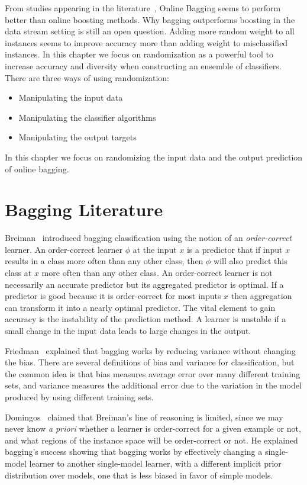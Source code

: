 From studies appearing in the literature~\cite{ozabagboost,ozaexp,ensemble},
Online Bagging seems to perform better than online boosting methods. Why bagging outperforms boosting in the data stream setting is still an open question. Adding more random weight to all instances seems to improve accuracy more than adding weight to misclassified instances. In this chapter %
 we focus on randomization as a powerful tool to increase accuracy and diversity when constructing an ensemble of classifiers.
There are three ways of using randomization:
\begin{itemize}
\item Manipulating the input data
\item Manipulating the classifier algorithms   
\item Manipulating the output targets
\end{itemize}
 
In this chapter we focus on randomizing the input data and the output prediction of online bagging.

\section{Bagging Literature}
\label{Rel}

Breiman~\cite{bagging} introduced bagging classification using the notion of an {\em order-correct} learner. An order-correct learner $\phi$ at the input $x$ is a predictor that if input $x$ results in a class more often than any other class, then $\phi$ will also predict this class at $x$ more often than any other class. An order-correct learner is not necessarily an accurate predictor but its aggregated predictor is optimal. If a predictor is good because it is order-correct for most inputs $x$ then aggregation can transform it into a nearly optimal predictor. The vital element to gain accuracy is the instability of the prediction method. A learner is unstable if a small change in the input data leads to large changes in the output.

Friedman~\cite{friedman} explained that bagging works by reducing variance without changing the bias. There are several definitions of bias and variance for classification, but the common idea is that bias measures average error over many different training sets, and variance measures the additional error due to the variation in the model produced by using different training sets.

Domingos~\cite{Domingos97} claimed that Breiman's line of reasoning is limited, since we may never know {\em a priori} whether a learner is order-correct for a given example or not, and what regions of the instance space will be order-correct or not. He explained bagging's success showing that bagging works by effectively changing a single-model learner to another single-model learner, with a different implicit prior distribution over models, one that is less biased in favor of simple models.

